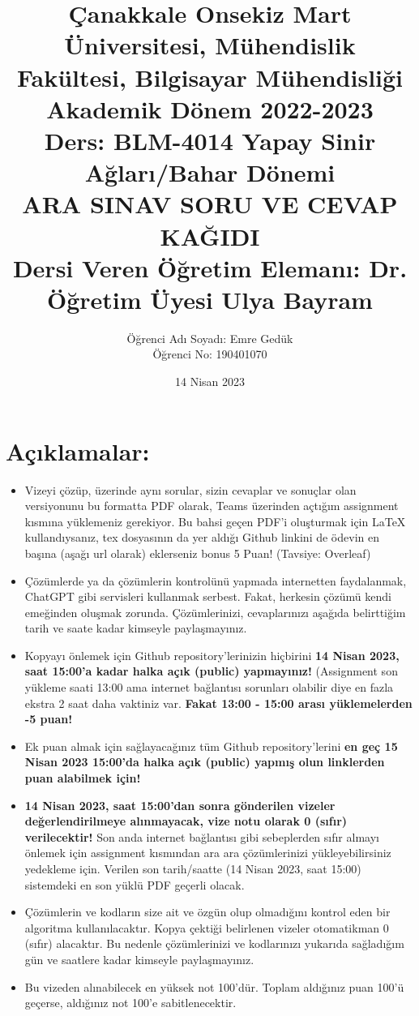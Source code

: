 \documentclass[11pt]{article}
\title{Çanakkale Onsekiz Mart Üniversitesi, Mühendislik Fakültesi, Bilgisayar Mühendisliği Akademik Dönem 2022-2023\\
Ders: BLM-4014 Yapay Sinir Ağları/Bahar Dönemi\\ 
ARA SINAV SORU VE CEVAP KAĞIDI\\
Dersi Veren Öğretim Elemanı: Dr. Öğretim Üyesi Ulya Bayram}
\author{%
\begin{minipage}{\textwidth}
\raggedright
Öğrenci Adı Soyadı: Emre Gedük\\ %
Öğrenci No: 190401070
\end{minipage}%
}
\date{14 Nisan 2023}
\begin{document}
\maketitle

\vspace{-.5in}
\section*{Açıklamalar:}
\begin{itemize}
    \item Vizeyi çözüp, üzerinde aynı sorular, sizin cevaplar ve sonuçlar olan versiyonunu bu formatta PDF olarak, Teams üzerinden açtığım assignment kısmına yüklemeniz gerekiyor. Bu bahsi geçen PDF'i oluşturmak için LaTeX kullandıysanız, tex dosyasının da yer aldığı Github linkini de ödevin en başına (aşağı url olarak) eklerseniz bonus 5 Puan! (Tavsiye: Overleaf)
    \item Çözümlerde ya da çözümlerin kontrolünü yapmada internetten faydalanmak, ChatGPT gibi servisleri kullanmak serbest. Fakat, herkesin çözümü kendi emeğinden oluşmak zorunda. Çözümlerinizi, cevaplarınızı aşağıda belirttiğim tarih ve saate kadar kimseyle paylaşmayınız. 
    \item Kopyayı önlemek için Github repository'lerinizin hiçbirini \textbf{14 Nisan 2023, saat 15:00'a kadar halka açık (public) yapmayınız!} (Assignment son yükleme saati 13:00 ama internet bağlantısı sorunları olabilir diye en fazla ekstra 2 saat daha vaktiniz var. \textbf{Fakat 13:00 - 15:00 arası yüklemelerden -5 puan!}
    \item Ek puan almak için sağlayacağınız tüm Github repository'lerini \textbf{en geç 15 Nisan 2023 15:00'da halka açık (public) yapmış olun linklerden puan alabilmek için!}
    \item \textbf{14 Nisan 2023, saat 15:00'dan sonra gönderilen vizeler değerlendirilmeye alınmayacak, vize notu olarak 0 (sıfır) verilecektir!} Son anda internet bağlantısı gibi sebeplerden sıfır almayı önlemek için assignment kısmından ara ara çözümlerinizi yükleyebilirsiniz yedekleme için. Verilen son tarih/saatte (14 Nisan 2023, saat 15:00) sistemdeki en son yüklü PDF geçerli olacak.
    \item Çözümlerin ve kodların size ait ve özgün olup olmadığını kontrol eden bir algoritma kullanılacaktır. Kopya çektiği belirlenen vizeler otomatikman 0 (sıfır) alacaktır. Bu nedenle çözümlerinizi ve kodlarınızı yukarıda sağladığım gün ve saatlere kadar kimseyle paylaşmayınız.
    \item Bu vizeden alınabilecek en yüksek not 100'dür. Toplam aldığınız puan 100'ü geçerse, aldığınız not 100'e sabitlenecektir.

\end{itemize}
\end{document}
